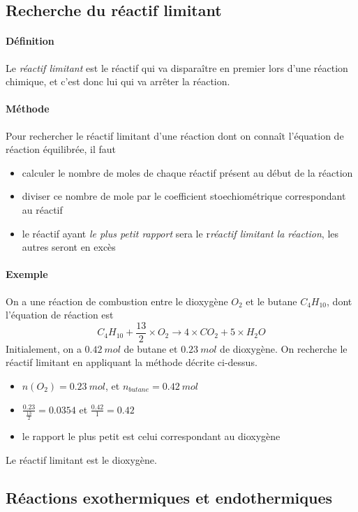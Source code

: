 \subsection{Recherche du réactif limitant}
\paragraph{Définition} Le \textit{réactif limitant} est le réactif qui va disparaître en premier lors d'une réaction chimique, et c'est donc lui qui va
arrêter la réaction.
\paragraph{Méthode} Pour rechercher le réactif limitant d'une réaction dont on connaît l'équation de réaction équilibrée, il faut
\begin{itemize}
 \item calculer le nombre de moles de chaque réactif présent au début de la réaction
 \item diviser ce nombre de mole par le coefficient stoechiométrique correspondant au réactif
 \item le réactif ayant \textit{le plus petit rapport} sera le r\textit{réactif limitant la réaction}, les autres seront en excès
\end{itemize}

\paragraph{Exemple} On a une réaction de combustion entre le dioxygène $O_2$ et le butane $C_4H_{10}$, dont l'équation de réaction est
$$ C_4H_{10} + \frac{13}{2} \times O_2 \xrightarrow{} 4 \times CO_2 + 5 \times H_2O $$ Initialement, on a $0.42~mol$ de butane et $0.23~mol$ de dioxygène.
On recherche le réactif limitant en appliquant la méthode décrite ci-dessus.
\begin{itemize}
 \item $n(O_2) = 0.23~mol$, et $ n_{butane} = 0.42~mol$
 \item $\frac{0.23}{\frac{13}{2}} = 0.0354$ et $\frac{0.42}{1} = 0.42$
 \item le rapport le plus petit est celui correspondant au dioxygène
\end{itemize}
Le réactif limitant est le dioxygène.


\subsection{Réactions exothermiques et endothermiques}
